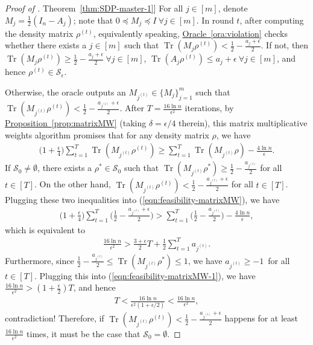 \documentclass[a4paper,UKenglish,cleveref, autoref]{lipics-v2019}
\theoremstyle{remark}
\numberwithin{equation}{section}
\numberwithin{oracle}{section}
\numberwithin{remark}{section}
\newcommand{\eqn}[1]{(\ref{eqn:#1})}
\newcommand{\ora}[1]{\hyperref[ora:#1]{Oracle~\ref*{ora:#1}}}
\newcommand{\thm}[1]{\hyperref[thm:#1]{Theorem~\ref*{thm:#1}}}
\newcommand{\prop}[1]{\hyperref[prop:#1]{Proposition~\ref*{prop:#1}}}
\newcommand{\range}[1]{[#1]}
\DeclareMathOperator{\tr}{Tr}
\begin{document}
\begin{proof}[Proof of \thm{SDP-master-1}]
For all $j\in\range{m}$, denote $M_{j}=\frac{1}{2}(I_{n}-A_{j})$; note that $0\preceq M_{j}\preceq I\ \forall j\in\range{m}$. In round $t$, after computing the density matrix $\rho^{(t)}$, equivalently speaking, \ora{violation} checks whether there exists a $j\in\range{m}$ such that $\tr(M_{j} \rho^{(t)}) <\frac{1}{2}-\frac{a_{j}+\epsilon}{2}$. If not, then $\tr(M_{j} \rho^{(t)}) \geq\frac{1}{2}-\frac{a_{j}+\epsilon}{2}\ \forall j\in\range{m}$, $\tr(A_{j}  \rho^{(t)}) \leq a_{j}+\epsilon \ \forall j\in\range{m}$, and hence $\rho^{(t)}\in\mathcal{S}_{\epsilon}$.

Otherwise, the oracle outputs an $M_{j^{(t)}}\in \{M_{j}\}_{j=1}^{m}$ such that $\tr(M_{j^{(t)}} \rho^{(t)}) <\frac{1}{2}-\frac{a_{j^{(t)}}+\epsilon}{2}$. After $T=\frac{16\ln n}{\epsilon^{2}}$ iterations, by \prop{matrixMW} (taking $\delta=\epsilon/4$ therein), this matrix multiplicative weights algorithm promises that for any density matrix $\rho$, we have
\begin{align}\label{eqn:feasibility-matrixMW}
\Big(1+\frac{\epsilon}{4}\Big)\sum_{t=1}^{T}\tr(M_{j^{(t)}} \rho^{(t)}) \geq\sum_{t=1}^{T} \tr(M_{j^{(t)}} \rho)-\frac{4\ln n}{\epsilon}.
\end{align}
If $\mathcal{S}_{0}\neq\emptyset$, there exists a $\rho^{*}\in\mathcal{S}_{0}$ such that $\tr(M_{j^{(t)}} \rho^{*}) \geq\frac{1}{2}-\frac{a_{j^{(t)}}}{2}$ for all $t\in\range{T}$. On the other hand, $\tr(M_{j^{(t)}} \rho^{(t)})<\frac{1}{2}-\frac{a_{j^{(t)}}+\epsilon}{2}$ for all $t\in\range{T}$. Plugging these two inequalities into \eqn{feasibility-matrixMW}, we have
\begin{align}
\Big(1+\frac{\epsilon}{4}\Big)\sum_{t=1}^{T}\Big(\frac{1}{2}-\frac{a_{j^{(t)}}+\epsilon}{2}\Big)> \sum_{t=1}^{T}\Big(\frac{1}{2}-\frac{a_{j^{(t)}}}{2}\Big)-\frac{4\ln n}{\epsilon},
\end{align}
which is equivalent to
\begin{align}\label{eqn:feasibility-matrixMW-1}
\frac{16\ln n}{\epsilon^{2}}>\frac{3+\epsilon}{2}T+\frac{1}{2}\sum_{t=1}^{T}a_{j^{(t)}}.
\end{align}
Furthermore, since $\frac{1}{2}-\frac{a_{j^{(t)}}}{2}\leq\tr(M_{j^{(t)}} \rho^{*})\leq 1$, we have $a_{j^{(t)}}\geq -1$\ for all $t\in\range{T}$. Plugging this into \eqn{feasibility-matrixMW-1}, we have $\frac{16\ln n}{\epsilon^{2}}>(1+\frac{\epsilon}{2})T$, and hence
\begin{align}
T<\frac{16\ln n}{\epsilon^{2}(1+\epsilon/2)}<\frac{16\ln n}{\epsilon^{2}},
\end{align}
contradiction! Therefore, if $\tr(M_{j^{(t)}} \rho^{(t)})<\frac{1}{2}-\frac{a_{j^{(t)}}+\epsilon}{2}$ happens for at least $\frac{16\ln n}{\epsilon^{2}}$ times, it must be the case that $\mathcal{S}_{0}=\emptyset$.
\end{proof}
\end{document}
